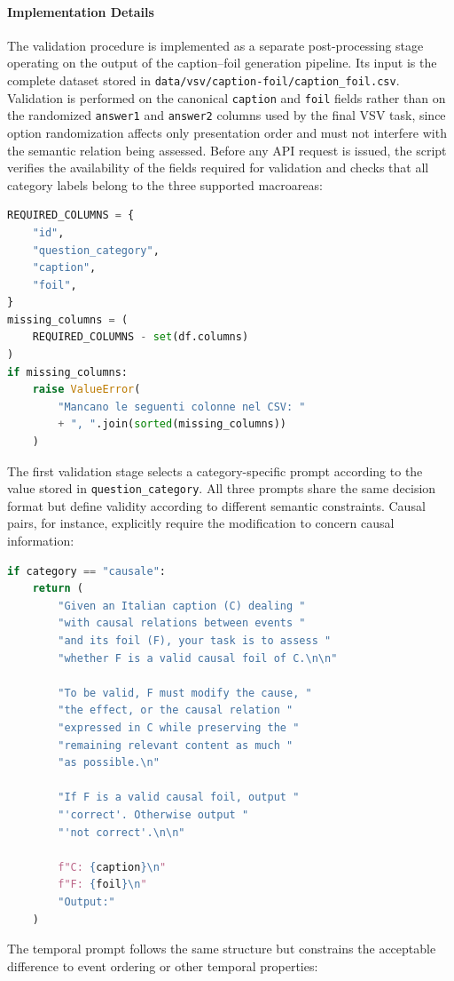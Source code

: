 \paragraph{Implementation Details}
The validation procedure is implemented as a separate post-processing stage operating on the output of the caption--foil generation pipeline. Its input is the complete dataset stored in \texttt{data/vsv/caption-foil/caption\_foil.csv}. Validation is performed on the canonical \texttt{caption} and \texttt{foil} fields rather than on the randomized \texttt{answer1} and \texttt{answer2} columns used by the final \ac{VSV} task, since option randomization affects only presentation order and must not interfere with the semantic relation being assessed.
Before any API request is issued, the script verifies the availability of the fields required for validation and checks that all category labels belong to the three supported macroareas:
\begin{lstlisting}[language=Python]
REQUIRED_COLUMNS = {
    "id",
    "question_category",
    "caption",
    "foil",
}
missing_columns = (
    REQUIRED_COLUMNS - set(df.columns)
)
if missing_columns:
    raise ValueError(
        "Mancano le seguenti colonne nel CSV: "
        + ", ".join(sorted(missing_columns))
    )
\end{lstlisting}
The first validation stage selects a category-specific prompt according to the value stored in \texttt{question\_category}. All three prompts share the same decision format but define validity according to different semantic constraints. Causal pairs, for instance, explicitly require the modification to concern causal information:
\begin{lstlisting}[language=Python]
if category == "causale":
    return (
        "Given an Italian caption (C) dealing "
        "with causal relations between events "
        "and its foil (F), your task is to assess "
        "whether F is a valid causal foil of C.\n\n"

        "To be valid, F must modify the cause, "
        "the effect, or the causal relation "
        "expressed in C while preserving the "
        "remaining relevant content as much "
        "as possible.\n"

        "If F is a valid causal foil, output "
        "'correct'. Otherwise output "
        "'not correct'.\n\n"

        f"C: {caption}\n"
        f"F: {foil}\n"
        "Output:"
    )
\end{lstlisting}
The temporal prompt follows the same structure but constrains the acceptable difference to event ordering or other temporal properties:

